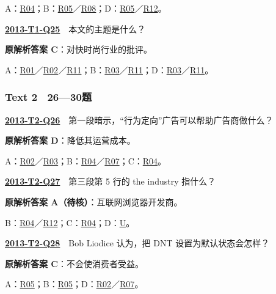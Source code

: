 \documentclass[11pt,a4paper]{article}
\begin{document}
\noindent A：\hyperref[cat-R04]{R04}；B：\hyperref[cat-R05]{R05}／\hyperref[cat-R08]{R08}；D：\hyperref[cat-R05]{R05}／\hyperref[cat-R12]{R12}。\par\smallskip
{}\label{idx-2013-T1-Q25}\noindent\textbf{\href{https://zj139.github.io/math-notes/english/e12e6c6712b9ddb12ecc7057/\#q25}{2013-T1-Q25}}　本文的主题是什么？\par\nopagebreak
\noindent\textbf{原解析答案 C}：对快时尚行业的批评。\par\nopagebreak
\noindent A：\hyperref[cat-R01]{R01}／\hyperref[cat-R02]{R02}／\hyperref[cat-R11]{R11}；B：\hyperref[cat-R03]{R03}／\hyperref[cat-R11]{R11}；D：\hyperref[cat-R03]{R03}／\hyperref[cat-R11]{R11}。\par\smallskip
{}\subsubsection{Text 2　26—30题}
\label{idx-2013-T2-Q26}\noindent\textbf{\href{https://zj139.github.io/math-notes/english/24e1f1efe1e982cf789b6917/\#q26}{2013-T2-Q26}}　第一段暗示，“行为定向”广告可以帮助广告商做什么？\par\nopagebreak
\noindent\textbf{原解析答案 D}：降低其运营成本。\par\nopagebreak
\noindent A：\hyperref[cat-R02]{R02}／\hyperref[cat-R03]{R03}；B：\hyperref[cat-R04]{R04}／\hyperref[cat-R07]{R07}；C：\hyperref[cat-R04]{R04}。\par\smallskip
{}\label{idx-2013-T2-Q27}\noindent\textbf{\href{https://zj139.github.io/math-notes/english/24e1f1efe1e982cf789b6917/\#q27}{2013-T2-Q27}}　第三段第 5 行的 the industry 指什么？\par\nopagebreak
\noindent\textbf{原解析答案 A（待核）}：互联网浏览器开发商。\par\nopagebreak
\noindent B：\hyperref[cat-R04]{R04}／\hyperref[cat-R12]{R12}；C：\hyperref[cat-R04]{R04}；D：\hyperref[dispute]{U}。\par\smallskip
{}\label{idx-2013-T2-Q28}\noindent\textbf{\href{https://zj139.github.io/math-notes/english/24e1f1efe1e982cf789b6917/\#q28}{2013-T2-Q28}}　Bob Liodice 认为，把 DNT 设置为默认状态会怎样？\par\nopagebreak
\noindent\textbf{原解析答案 C}：不会使消费者受益。\par\nopagebreak
\noindent A：\hyperref[cat-R05]{R05}；B：\hyperref[cat-R05]{R05}；D：\hyperref[cat-R02]{R02}／\hyperref[cat-R07]{R07}。\par\smallskip
\end{document}
